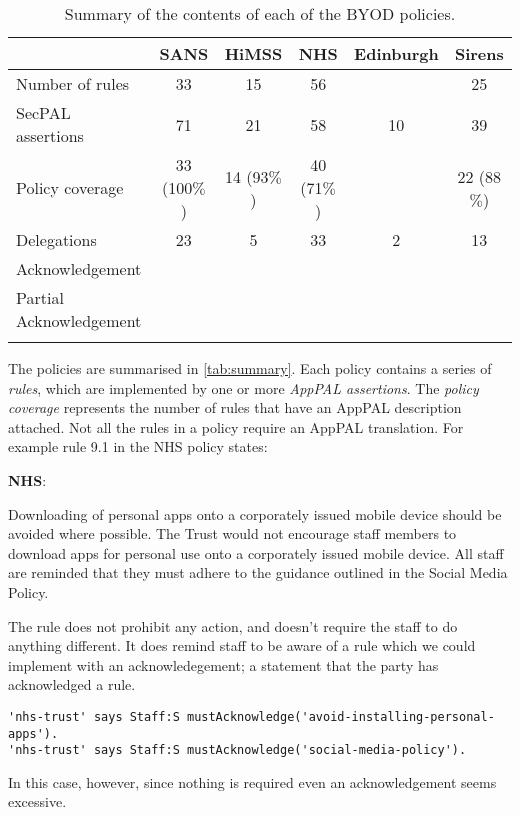 \documentclass{article}
\newenvironment{policyrule}[1]{%
  \begin{framed}
      \noindent\textbf{\sffamily #1}:~\itshape
}{
  \end{framed}
}
\begin{document}
\begin{table}\centering\footnotesize\sffamily
  \begin{tabular}{l c c c c c}
    \toprule
                             & {SANS}       & {HiMSS}     & {NHS}       & {Edinburgh} & {Sirens}    \\
    \midrule
    Number of rules          & 33           & 15          & 56          &             & 25          \\
    SecPAL assertions        & 71           & 21          & 58          & 10          & 39          \\
    Policy coverage          & 33 (100$\%$) & 14 (93$\%$) & 40 (71$\%$) &             & 22 (88$\%$) \\
    \midrule
    Delegations              & 23           & 5           & 33          & 2           & 13          \\
    Acknowledgement          &              &             &             &             &             \\
    Partial Acknowledgement  &              &             &             &             &             \\
    \bottomrule             \\
  \end{tabular}
  \label{tab:summary}
  \caption{Summary of the contents of each of the BYOD policies.}
\end{table}

The policies are summarised in \autoref{tab:summary}.
Each policy contains a series of \emph{rules}, which are implemented by one or more \emph{AppPAL assertions}.
The \emph{policy coverage} represents the number of rules that have an AppPAL description attached.
Not all the rules in a policy require an AppPAL translation.
For example rule 9.1 in the NHS policy states:
\begin{policyrule}{NHS}
  Downloading of personal apps onto a corporately issued mobile device should be avoided where possible. 
  The Trust would not encourage staff members to download apps for personal use onto a corporately issued mobile device.
  All staff are reminded that they must adhere to the guidance outlined in the Social Media Policy.
\end{policyrule}
The rule does not prohibit any action, and doesn't require the staff to do anything different.
It does remind staff to be aware of a rule which we could implement with an acknowledegement; a statement that the party has acknowledged a rule.
\begin{lstlisting}
'nhs-trust' says Staff:S mustAcknowledge('avoid-installing-personal-apps').
'nhs-trust' says Staff:S mustAcknowledge('social-media-policy').
\end{lstlisting}
In this case, however, since nothing is required even an acknowledgement seems excessive.
\end{document}
